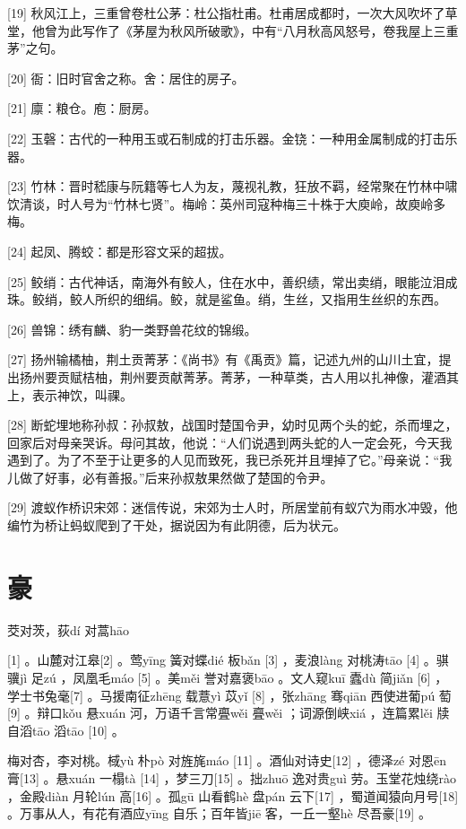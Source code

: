 \documentclass[12pt,UTF8]{ctexbook}
\begin{document}
[19] 秋风江上，三重曾卷杜公茅：杜公指杜甫。杜甫居成都时，一次大风吹坏了草堂，他曾为此写作了《茅屋为秋风所破歌》，中有“八月秋高风怒号，卷我屋上三重茅”之句。

[20] 衙：旧时官舍之称。舍：居住的房子。

[21] 廪：粮仓。庖：厨房。

[22] 玉磬：古代的一种用玉或石制成的打击乐器。金铙：一种用金属制成的打击乐器。

[23] 竹林：晋时嵇康与阮籍等七人为友，蔑视礼教，狂放不羁，经常聚在竹林中啸饮清谈，时人号为“竹林七贤”。梅岭：英州司寇种梅三十株于大庾岭，故庾岭多梅。

[24] 起凤、腾蛟：都是形容文采的超拔。

[25] 鲛绡：古代神话，南海外有鲛人，住在水中，善织绩，常出卖绡，眼能泣泪成珠。鲛绡，鲛人所织的细绢。鲛，就是鲨鱼。绡，生丝，又指用生丝织的东西。

[26] 兽锦：绣有麟、豹一类野兽花纹的锦缎。

[27] 扬州输橘柚，荆土贡菁茅：《尚书》有《禹贡》篇，记述九州的山川土宜，提出扬州要贡赋桔柚，荆州要贡献菁茅。菁茅，一种草类，古人用以扎神像，灌酒其上，表示神饮，叫祼。

[28] 断蛇埋地称孙叔：孙叔敖，战国时楚国令尹，幼时见两个头的蛇，杀而埋之，回家后对母亲哭诉。母问其故，他说：“人们说遇到两头蛇的人一定会死，今天我遇到了。为了不至于让更多的人见而致死，我已杀死并且埋掉了它。”母亲说：“我儿做了好事，必有善报。”后来孙叔敖果然做了楚国的令尹。

[29] 渡蚁作桥识宋郊：迷信传说，宋郊为士人时，所居堂前有蚁穴为雨水冲毁，他编竹为桥让蚂蚁爬到了干处，据说因为有此阴德，后为状元。





\chapter{豪}


茭对茨，荻dí 对蒿hāo





[1] 。山麓对江皋[2] 。莺yīng 簧对蝶dié 板bǎn [3] ，麦浪làng 对桃涛tāo [4] 。骐骥jì 足zú ，凤凰毛máo [5] 。美měi 誉对嘉褒bāo 。文人窥kuī 蠹dù 简jiǎn [6] ，学士书兔毫[7] 。马援南征zhēng 载薏yì 苡yǐ [8] ，张zhāng 骞qiān 西使进葡pú 萄[9] 。辩口kǒu 悬xuán 河，万语千言常亹wěi 亹wěi ；词源倒峡xiá ，连篇累lěi 牍自滔tāo 滔tāo [10] 。

梅对杏，李对桃。棫yù 朴pò 对旌旄máo [11] 。酒仙对诗史[12] ，德泽zé 对恩ēn 膏[13] 。悬xuán 一榻tà [14] ，梦三刀[15] 。拙zhuō 逸对贵guì 劳。玉堂花烛绕rào ，金殿diàn 月轮lún 高[16] 。孤gū 山看鹤hè 盘pán 云下[17] ，蜀道闻猿向月号[18] 。万事从人，有花有酒应yīng 自乐；百年皆jiē 客，一丘一壑hè 尽吾豪[19] 。
\end{document}
